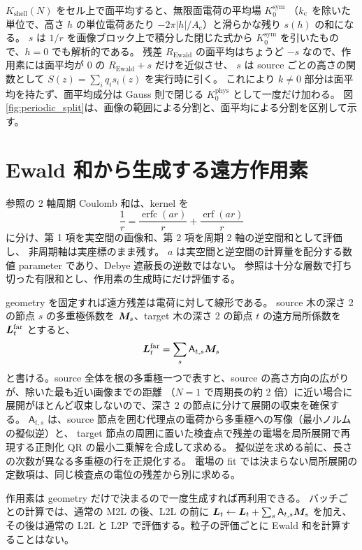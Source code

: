 $K_{\mathrm{shell}}(N)$ をセル上で面平均すると、無限面電荷の平均場 $K_0^{\mathrm{sym}}$
（$k_{\mathrm c}$ を除いた単位で、高さ $h$ の単位電荷あたり $-2\pi|h|/A_{\mathrm c}$）と滑らかな残り $s(h)$ の和になる。
$s$ は $1/r$ を画像ブロック上で積分した閉じた式から $K_0^{\mathrm{sym}}$ を引いたもので、$h=0$ でも解析的である。
残差 $R_{\mathrm{Ewald}}$ の面平均はちょうど $-s$ なので、作用素には面平均が 0 の $R_{\mathrm{Ewald}}+s$ だけを近似させ、
$s$ は source ごとの高さの関数として $S(z)=\sum_iq_is_i(z)$ を実行時に引く。
これにより $k\ne0$ 部分は面平均を持たず、面平均成分は Gauss 則で閉じる $K_0^{\mathrm{phys}}$ として一度だけ加わる。
図\ref{fig:periodic_split}は、画像の範囲による分割と、面平均による分割を区別して示す。


\section{Ewald 和から生成する遠方作用素}
参照の 2 軸周期 Coulomb 和は、kernel を
\begin{equation}
 \frac1r=\frac{\operatorname{erfc}(a r)}r
            +\frac{\operatorname{erf}(a r)}r
\end{equation}
に分け、第 1 項を実空間の画像和、第 2 項を周期 2 軸の逆空間和として評価し、
非周期軸は実座標のまま残す\citep{LindboTornberg2012}。
$a$ は実空間と逆空間の計算量を配分する数値 parameter であり、Debye 遮蔽長の逆数ではない。
参照は十分な層数で打ち切った有限和とし、作用素の生成時にだけ評価する。

geometry を固定すれば遠方残差は電荷に対して線形である。
source 木の深さ 2 の節点 $s$ の多重極係数を $\bm{M}_s$、target 木の深さ 2 の節点 $t$ の遠方局所係数を
$\bm{L}_t^{\mathrm{far}}$ とすると、
\begin{equation}
 \bm{L}_t^{\mathrm{far}}=\sum_s\mathsf A_{t,s}\bm{M}_s
\end{equation}
と書ける。source 全体を根の多重極一つで表すと、source の高さ方向の広がりが、除いた最も近い画像までの距離
（$N=1$ で周期長の約 2 倍）に近い場合に展開がほとんど収束しないので、深さ 2 の節点に分けて展開の収束を確保する。
$\mathsf A_{t,s}$ は、source 節点を囲む代理点の電荷から多重極への写像（最小ノルムの擬似逆）と、
target 節点の周囲に置いた検査点で残差の電場を局所展開で再現する正則化 QR の最小二乗解を合成して求める。
擬似逆を求める前に、長さの次数が異なる多重極の行を正規化する。
電場の fit では決まらない局所展開の定数項は、同じ検査点の電位の残差から別に求める。

作用素は geometry だけで決まるので一度生成すれば再利用できる。
バッチごとの計算では、通常の M2L の後、L2L の前に $\bm{L}_t\leftarrow\bm{L}_t+\sum_s\mathsf A_{t,s}\bm{M}_s$ を加え、
その後は通常の L2L と L2P で評価する。粒子の評価ごとに Ewald 和を計算することはない。

